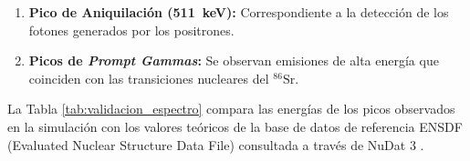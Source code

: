 \begin{enumerate}
    \item \textbf{Pico de Aniquilación (\SI{511}{\kilo\electronvolt}):} Correspondiente a la detección de los fotones generados por los positrones.
    \item \textbf{Picos de \textit{Prompt Gammas}:} Se observan emisiones de alta energía que coinciden con las transiciones nucleares del $^{86}\text{Sr}$.
\end{enumerate}

La Tabla \ref{tab:validacion_espectro} compara las energías de los picos observados en la simulación con los valores teóricos de la base de datos de referencia ENSDF (Evaluated Nuclear Structure Data File) consultada a través de NuDat 3 \cite{bnlNuDat}.

\begin{table}[htbp]
    \centering
    \caption{Comparación entre las energías de emisión simuladas y los datos nucleares de referencia para el $^{86}\text{Y}$.}
    \label{tab:validacion_espectro}
\end{table}

